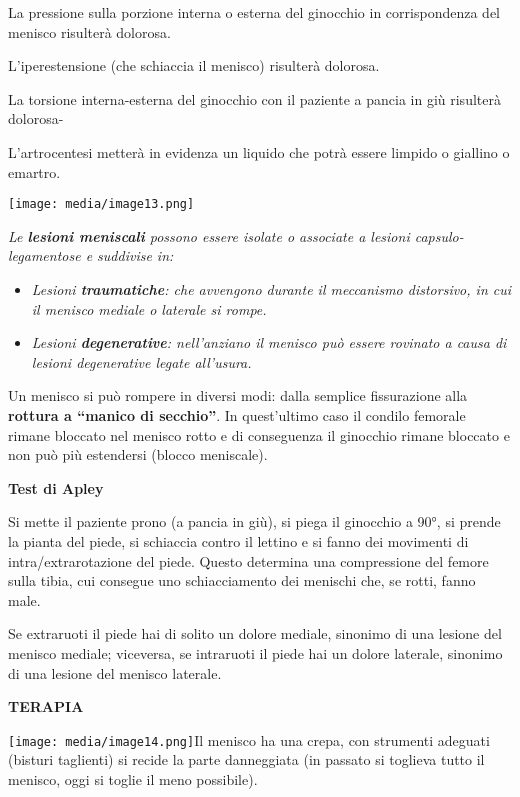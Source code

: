 \documentclass[]{article}
\begin{document}
La pressione sulla porzione interna o esterna del ginocchio in
corrispondenza del menisco risulterà dolorosa.

L'iperestensione (che schiaccia il menisco) risulterà dolorosa.

La torsione interna-esterna del ginocchio con il paziente a pancia in
giù risulterà dolorosa-

L'artrocentesi metterà in evidenza un liquido che potrà essere limpido o
giallino o emartro.

\texttt{[image: media/image13.png]}

\emph{Le \textbf{lesioni meniscali} possono essere isolate o associate a
lesioni capsulo-legamentose e suddivise in:}

\begin{itemize}
\item
  \emph{Lesioni \textbf{traumatiche}: che avvengono durante il
  meccanismo distorsivo, in cui il menisco mediale o laterale si rompe.}
\item
  \emph{Lesioni \textbf{degenerative}: nell'anziano il menisco può
  essere rovinato a causa di lesioni degenerative legate all'usura.}
\end{itemize}

Un menisco si può rompere in diversi modi: dalla semplice fissurazione
alla \textbf{rottura a ``manico di secchio''}. In quest'ultimo caso il
condilo femorale rimane bloccato nel menisco rotto e di conseguenza il
ginocchio rimane bloccato e non può più estendersi (blocco meniscale).

\textbf{Test di Apley}

Si mette il paziente prono (a pancia in giù), si piega il ginocchio a
90°, si prende la pianta del piede, si schiaccia contro il lettino e si
fanno dei movimenti di intra/extrarotazione del piede. Questo determina
una compressione del femore sulla tibia, cui consegue uno schiacciamento
dei menischi che, se rotti, fanno male.

Se extraruoti il piede hai di solito un dolore mediale, sinonimo di una
lesione del menisco mediale; viceversa, se intraruoti il piede hai un
dolore laterale, sinonimo di una lesione del menisco laterale.

\textbf{TERAPIA}

\texttt{[image: media/image14.png]}Il
menisco ha una crepa, con strumenti adeguati (bisturi taglienti) si
recide la parte danneggiata (in passato si toglieva tutto il menisco,
oggi si toglie il meno possibile).
\end{document}
